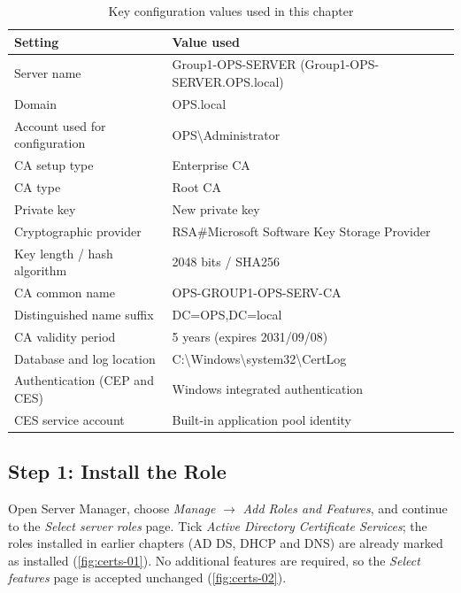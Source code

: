 \begin{table}[htbp]
  \centering
  \small
  \begin{tabular}{@{}ll@{}}
    \toprule
    \textbf{Setting} & \textbf{Value used} \\
    \midrule
    Server name                        & Group1-OPS-SERVER (Group1-OPS-SERVER.OPS.local) \\
    Domain                             & OPS.local \\
    Account used for configuration     & OPS\textbackslash Administrator \\
    CA setup type                      & Enterprise CA \\
    CA type                            & Root CA \\
    Private key                        & New private key \\
    Cryptographic provider             & RSA\#Microsoft Software Key Storage Provider \\
    Key length / hash algorithm        & 2048 bits / SHA256 \\
    CA common name                     & OPS-GROUP1-OPS-SERV-CA \\
    Distinguished name suffix          & DC=OPS,DC=local \\
    CA validity period                 & 5 years (expires 2031/09/08) \\
    Database and log location          & C:\textbackslash Windows\textbackslash system32\textbackslash CertLog \\
    Authentication (CEP and CES)       & Windows integrated authentication \\
    CES service account                & Built-in application pool identity \\
    \bottomrule
  \end{tabular}
  \caption{Key configuration values used in this chapter}
  \label{tab:certs-config}
\end{table}

\subsection{Step 1: Install the Role}
\label{sec:certs-step1}
Open Server Manager, choose \emph{Manage} $\rightarrow$ \emph{Add Roles and Features}, and continue to the \emph{Select server roles} page. Tick \emph{Active Directory Certificate Services}; the roles installed in earlier chapters (AD DS, DHCP and DNS) are already marked as installed (\autoref{fig:certs-01}). No additional features are required, so the \emph{Select features} page is accepted unchanged (\autoref{fig:certs-02}).

